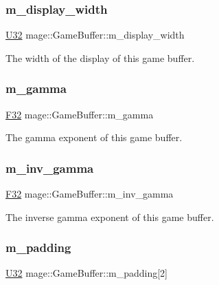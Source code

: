\subsubsection{\texorpdfstring{m\+\_\+display\+\_\+width}{m\_display\_width}}
{\footnotesize\ttfamily \hyperlink{namespacemage_a41c104c036fba3756a74e19f793eeaa1}{U32} mage\+::\+Game\+Buffer\+::m\+\_\+display\+\_\+width}

The width of the display of this game buffer. \hypertarget{structmage_1_1_game_buffer_a7c7abe0dbee37447b27c9e7f7c95d479}{}\label{structmage_1_1_game_buffer_a7c7abe0dbee37447b27c9e7f7c95d479} 
\subsubsection{\texorpdfstring{m\+\_\+gamma}{m\_gamma}}
{\footnotesize\ttfamily \hyperlink{namespacemage_aa97e833b45f06d60a0a9c4fc22ae02c0}{F32} mage\+::\+Game\+Buffer\+::m\+\_\+gamma}

The gamma exponent of this game buffer. \hypertarget{structmage_1_1_game_buffer_a52ddb29e16782a4dcc4e6818b3983c20}{}\label{structmage_1_1_game_buffer_a52ddb29e16782a4dcc4e6818b3983c20} 
\subsubsection{\texorpdfstring{m\+\_\+inv\+\_\+gamma}{m\_inv\_gamma}}
{\footnotesize\ttfamily \hyperlink{namespacemage_aa97e833b45f06d60a0a9c4fc22ae02c0}{F32} mage\+::\+Game\+Buffer\+::m\+\_\+inv\+\_\+gamma}

The inverse gamma exponent of this game buffer. \hypertarget{structmage_1_1_game_buffer_a6ab9b395e6cf4a6e120bb7ddf4be6913}{}\label{structmage_1_1_game_buffer_a6ab9b395e6cf4a6e120bb7ddf4be6913} 
\subsubsection{\texorpdfstring{m\+\_\+padding}{m\_padding}}
{\footnotesize\ttfamily \hyperlink{namespacemage_a41c104c036fba3756a74e19f793eeaa1}{U32} mage\+::\+Game\+Buffer\+::m\+\_\+padding\mbox{[}2\mbox{]}}

